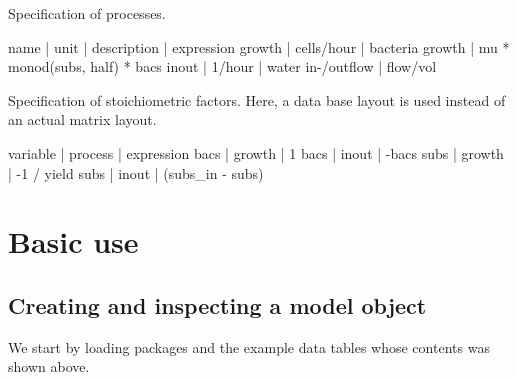 \documentclass[onecolumn]{article}
\begin{document}
\begin{table}[p]
\caption{Specification of processes. \label{tab:pros}}
\begin{shaded}\begin{small}
\begin{Schunk}
\begin{Soutput}
   name |       unit |       description |                    expression
 growth | cells/hour | bacteria growth   | mu * monod(subs, half) * bacs
 inout  | 1/hour     | water in-/outflow | flow/vol                     
\end{Soutput}
\end{Schunk}
\end{small}\end{shaded}
\end{table}

\begin{table}[p]
\caption{Specification of stoichiometric factors. Here, a data base layout is used instead of an actual matrix layout. \label{tab:stoi}}
\begin{shaded}\begin{small}
\begin{Schunk}
\begin{Soutput}
 variable | process |       expression
     bacs |  growth | 1               
     bacs |  inout  | -bacs           
     subs |  growth | -1 / yield      
     subs |  inout  | (subs_in - subs)
\end{Soutput}
\end{Schunk}
\end{small}\end{shaded}
\end{table}


\clearpage
\section{Basic use}

\subsection{Creating and inspecting a model object}

We start by loading packages and the example data tables whose contents was shown above.
\end{document}
